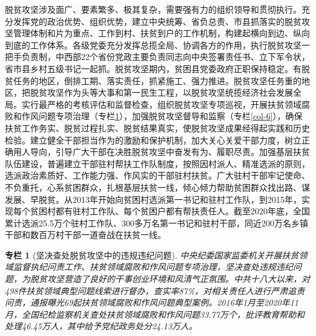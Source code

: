 \documentclass{ctexart}
\newtheorem{zhuanlan}{专栏}
\begin{document}
脱贫攻坚涉及面广、要素繁多、极其复杂，需要强有力的组织领导和贯彻执行。充分发挥党的政治优势、组织优势，建立中央统筹、省负总责、市县抓落实的脱贫攻坚管理体制和片为重点、工作到村、扶贫到户的工作机制，构建起横向到边、纵向到底的工作体系。各级党委充分发挥总揽全局、协调各方的作用，执行脱贫攻坚一把手负责制，中西部22个省份党政主要负责同志向中央签署责任书、立下军令状，省市县乡村五级书记一起抓。脱贫攻坚期内，贫困县党委政府正职保持稳定。有脱贫任务的地区，倒排工期、落实责任，抓紧施工、强力推进。脱贫攻坚任务重的地区，把脱贫攻坚作为头等大事和第一民生工程，以脱贫攻坚统揽经济社会发展全局。实行最严格的考核评估和监督检查，组织脱贫攻坚专项巡视，开展扶贫领域腐败和作风问题专项治理（专栏\ref{col-5}），加强脱贫攻坚督导和监察（专栏\ref{col-6}），确保扶贫工作务实、脱贫过程扎实、脱贫结果真实，使脱贫攻坚成果经得起实践和历史检验。建立健全干部担当作为的激励和保护机制，加大关心关爱干部力度，树立正确用人导向，引导广大干部在决胜脱贫攻坚中奋发有为、履职尽责。加强基层扶贫队伍建设，普遍建立干部驻村帮扶工作队制度，按照因村派人、精准选派的原则，选派政治素质好、工作能力强、作风实的干部驻村扶贫。广大驻村干部牢记使命、不负重托，心系贫困群众，扎根基层扶贫一线，倾心倾力帮助贫困群众找出路、谋发展、早脱贫。从2013年开始向贫困村选派第一书记和驻村工作队，到2015年，实现每个贫困村都有驻村工作队、每个贫困户都有帮扶责任人。截至2020年底，全国累计选派25.5万个驻村工作队、300多万名第一书记和驻村干部，同近200万名乡镇干部和数百万村干部一道奋战在扶贫一线。

\begin{zhuanlan}[坚决查处脱贫攻坚中的违规违纪问题]
    中央纪委国家监委机关开展扶贫领域监督执纪问责工作、扶贫领域腐败和作风问题专项治理，坚决查处违规违纪问题，为脱贫攻坚营造了良好的干事创业环境和风清气正氛围。中共十八大以来，对498件扶贫领域典型问题线索进行督办，查实率87\%，对相关责任人进行严肃追责问责，通报曝光69起扶贫领域腐败和作风问题典型案例。2016年1月至2020年11月，全国纪检监察机关查处扶贫领域腐败和作风问题33.77万个，批评教育帮助和处理46.45万人，其中给予党纪政务处分24.13万人。
    \label{col-5}
\end{zhuanlan}
\end{document}
